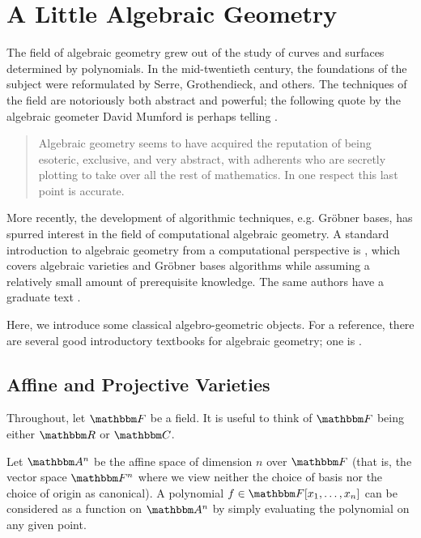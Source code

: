 \documentclass[11pt,titlepage]{article}
\numberwithin{equation}{section}
\begin{document}
\appendix

\section{A Little Algebraic Geometry}

    The field of algebraic geometry grew out of the study of curves and surfaces
    determined by polynomials.  In the mid-twentieth century, the foundations of
    the subject were reformulated by Serre, Grothendieck, and others.  The
    techniques of the field are notoriously both abstract and powerful; the
    following quote by the algebraic geometer David Mumford is perhaps telling
    \cite{Mum99}.
    \begin{quote}
        Algebraic geometry seems to have acquired the reputation of being
        esoteric, exclusive, and very abstract, with adherents who are secretly
        plotting to take over all the rest of mathematics.  In one respect this
        last point is accurate.
    \end{quote}
    More recently, the development of algorithmic techniques, e.g. Gröbner
    bases, has spurred interest in the field of computational algebraic
    geometry.  A standard introduction to algebraic geometry from a
    computational perspective is \cite{CLO97}, which covers algebraic varieties
    and Gröbner bases algorithms while assuming a relatively small amount of
    prerequisite knowledge.  The same authors have a graduate text \cite{CLO05}.

    Here, we introduce some classical algebro-geometric objects.  For a
    reference, there are several good introductory textbooks for algebraic
    geometry; one is \cite{Sha94}.

\subsection{Affine and Projective Varieties}
    \label{sec:varieties}
    Throughout, let $\F$ be a field.  It is useful to think of $\F$ being either
    $\R$ or $\C$.

    Let $\A^n$ be the affine space of dimension $n$ over $\F$ (that is, the
    vector space $\F^n$ where we view neither the choice of basis nor the choice
    of origin as canonical).  A polynomial $f \in \F[x_1, \ldots, x_n]$ can be
    considered as a function on $\A^n$ by simply evaluating the polynomial on
    any given point.
\end{document}
